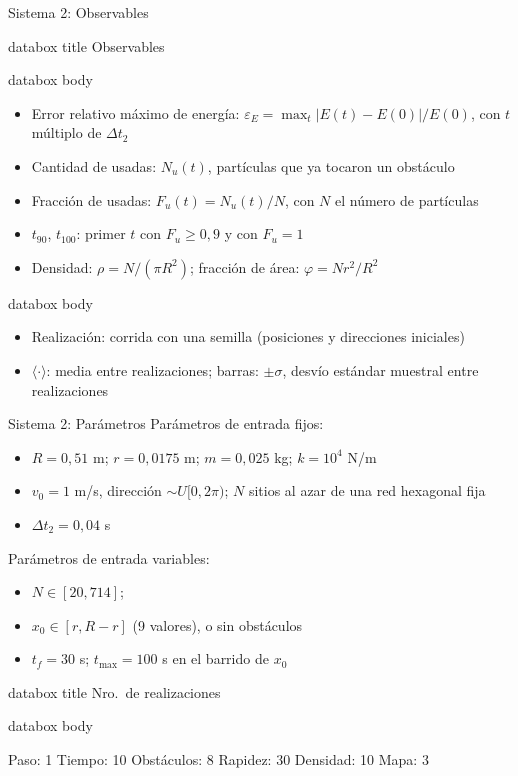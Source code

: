 \documentclass[aspectratio=43,11pt]{beamer}
\newcommand{\parambox}[1]{%
  \begin{beamercolorbox}[wd=\linewidth,sep=2mm]{databox body}
    \small\raggedright\hyphenpenalty=10000\exhyphenpenalty=10000
    \begin{itemize}[label=\textcolor{TPBlue}{$\bullet$},leftmargin=3.2mm,labelsep=1mm,itemsep=1mm,topsep=0pt,parsep=0pt]
      #1
    \end{itemize}
  \end{beamercolorbox}%
}
\newenvironment{databox}[1]{%
  \begin{beamercolorbox}[wd=\linewidth,sep=1mm,center]{databox title}%
    #1
  \end{beamercolorbox}%
  \par\nointerlineskip
  \begin{beamercolorbox}[wd=\linewidth,sep=2mm]{databox body}%
}{%
  \end{beamercolorbox}%
}
\begin{document}
\begin{frame}{Sistema 2: Observables}
  \begin{databox}{Observables}
    \begin{itemize}
      \item Error relativo máximo de energía: $\varepsilon_E = \max_t |E(t)-E(0)|/E(0)$, con $t$ múltiplo de $\Delta t_2$
      \item Cantidad de usadas: $N_u(t)$, partículas que ya tocaron un obstáculo
      \item Fracción de usadas: $F_u(t) = N_u(t)/N$, con $N$ el número de partículas
      \item $t_{90}$, $t_{100}$: primer $t$ con $F_u \geq 0{,}9$ y con $F_u = 1$
      \item Densidad: $\rho = N/(\pi R^2)$; fracción de área: $\varphi = N r^2/R^2$
    \end{itemize}
  \end{databox}
  \par\vspace{3mm}
  \parambox{\item Realización: corrida con una semilla (posiciones y direcciones iniciales)
    \item $\langle\cdot\rangle$: media entre realizaciones; barras: $\pm\sigma$, desvío estándar muestral entre realizaciones}
\end{frame}

\begin{frame}{Sistema 2: Parámetros}
  \small
  Parámetros de entrada fijos:
  \begin{itemize}[itemsep=1pt,topsep=2pt]
    \item $R = 0{,}51$ m; $r = 0{,}0175$ m; $m = 0{,}025$ kg; $k = 10^{4}$ N/m
    \item $v_0 = 1$ m/s, dirección $\sim U[0, 2\pi)$; $N$ sitios al azar de una red hexagonal fija
    \item $\Delta t_2 = 0{,}04$ s
  \end{itemize}
  Parámetros de entrada variables:
  \begin{itemize}[itemsep=1pt,topsep=2pt]
    \item $N \in [20, 714]$;
    \item $x_0 \in [r, R-r]$ (9 valores), o sin obstáculos
    \item $t_f = 30$ s; $t_{\max} = 100$ s en el barrido de $x_0$
  \end{itemize}
  \begin{databox}{Nro.\ de realizaciones}
    \centering
    Paso: 1 \hfill Tiempo: 10 \hfill Obstáculos: 8 \hfill Rapidez: 30 \hfill Densidad: 10 \hfill Mapa: 3
  \end{databox}
\end{frame}
\end{document}
